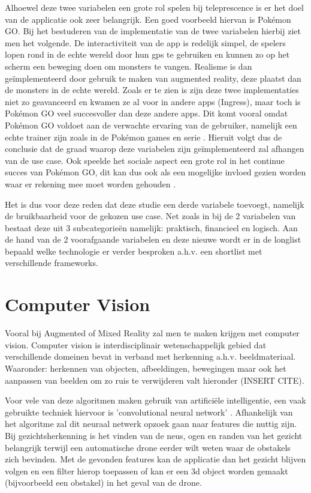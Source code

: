 Alhoewel deze twee variabelen een grote rol spelen bij teleprescence is er het doel van de applicatie ook zeer belangrijk. Een goed voorbeeld hiervan is Pokémon GO. Bij het bestuderen van de implementatie van de twee variabelen hierbij ziet men het volgende. De interactiviteit van de app is redelijk simpel, de spelers lopen rond in de echte wereld door hun gps te gebruiken en kunnen zo op het scherm een beweging doen om monsters te vangen. Realisme is dan geïmplementeerd door gebruik te maken van augmented reality, deze plaatst dan de monsters in de echte wereld. Zoals er te zien is zijn deze twee implementaties niet zo geavanceerd en kwamen ze al voor in andere apps (Ingress), maar toch is Pokémon GO veel succesvoller dan deze andere apps. Dit komt vooral omdat Pokémon GO voldoet aan de verwachte ervaring van de gebruiker, namelijk een echte trainer zijn zoals in de Pokémon games en serie \autocite{Tang2017}. Hieruit volgt dus de conclusie dat de graad waarop deze variabelen zijn geïmplementeerd zal afhangen van de use case. Ook speelde het sociale aspect een grote rol in het continue succes van Pokémon GO, dit kan dus ook als een mogelijke invloed gezien worden waar er rekening mee moet worden gehouden \autocite{Tang2017}.


Het is dus voor deze reden dat deze studie een derde variabele toevoegt, namelijk de bruikbaarheid voor de gekozen use case. Net zoals in bij de 2 variabelen van \textcite{Steuer1992} bestaat deze uit 3 subcategorieën namelijk: praktisch, financieel en logisch. Aan de hand van de 2 voorafgaande variabelen en deze nieuwe wordt er in de longlist bepaald welke technologie er verder besproken a.h.v. een shortlist met verschillende frameworks. 

\section{Computer Vision}

Vooral bij Augmented of Mixed Reality zal men te maken krijgen met computer vision. Computer vision is interdisciplinair wetenschappelijk gebied dat verschillende domeinen bevat in verband met herkenning a.h.v. beeldmateriaal. Waaronder: herkennen van objecten, afbeeldingen, bewegingen maar ook het aanpassen van beelden om zo ruis te verwijderen valt hieronder (INSERT CITE).

Voor vele van deze algoritmen maken gebruik van artificiële intelligentie, een vaak gebruikte techniek hiervoor is 'convolutional neural network' \autocite{Ji2013}. Afhankelijk van het algoritme zal dit neuraal netwerk opzoek gaan naar features die nuttig zijn. Bij gezichtsherkenning is het vinden van de neus, ogen en randen van het gezicht belangrijk terwijl een automatische drone eerder wilt weten waar de obstakels zich bevinden. Met de gevonden features kan de applicatie dan het gezicht blijven volgen en een filter hierop toepassen of kan er een 3d object worden gemaakt (bijvoorbeeld een obstakel) in het geval van de drone. 


